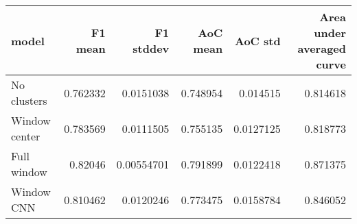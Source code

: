 \begin{tabular}{lrrrrr}
\toprule
 model         &   F1 mean &   F1 stddev &   AoC mean &   AoC std &   Area under averaged curve \\
\midrule
 No clusters   &  0.762332 &  0.0151038  &   0.748954 & 0.014515  &                    0.814618 \\
 Window center &  0.783569 &  0.0111505  &   0.755135 & 0.0127125 &                    0.818773 \\
 Full window   &  0.82046  &  0.00554701 &   0.791899 & 0.0122418 &                    0.871375 \\
 Window CNN    &  0.810462 &  0.0120246  &   0.773475 & 0.0158784 &                    0.846052 \\
\bottomrule
\end{tabular}